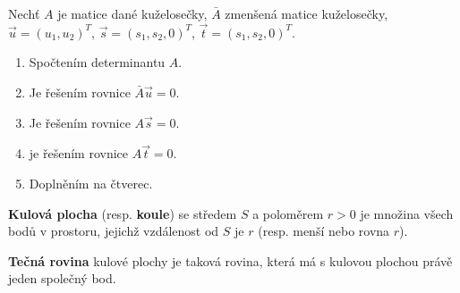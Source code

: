 \begin{navod}
Nechť $A$ je matice dané kuželosečky, $\bar{A}$ zmenšená matice kuželosečky, $\vec u=(u_1,u_2)^T$, $\vec s=(s_1,s_2,0)^T$, $\vec t=(s_1,s_2,0)^T$.
\begin{enumerate}[$a.$]
\item Spočtením determinantu $A$.
\item Je řešením rovnice $\bar A\vec u=0.$
\item Je řešením rovnice $A\vec s=0.$
\item je řešením rovnice $A\vec t = 0.$
\item Doplněním na čtverec.
\end{enumerate}
\end{navod}

\begin{definition}
\textbf{Kulová plocha} (resp. \textbf{koule}) se středem $S$ a poloměrem $r>0$ je množina všech bodů v prostoru,
jejichž vzdálenost od $S$ je $r$ (resp. menší nebo rovna $r$).
\end{definition}

\begin{definition}
\textbf{Tečná rovina} kulové plochy je taková rovina, která má s kulovou plochou právě
jeden společný bod.
\end{definition}
